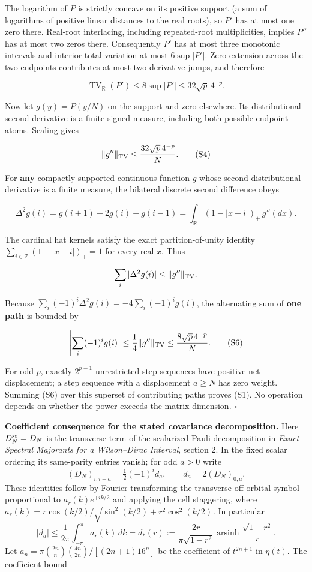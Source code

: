 \documentclass[
  10pt,
  a4paper,
]{article}
\begin{document}
The logarithm of \(P\) is strictly concave on its positive support (a sum of logarithms of positive linear distances to the real roots), so \(P'\) has at most one zero there. Real-root interlacing, including repeated-root multiplicities, implies \(P''\) has at most two zeros there. Consequently \(P'\) has at most three monotonic intervals and interior total variation at most \(6 \sup|P'|\). Zero extension across the two endpoints contributes at most two derivative jumps, and therefore

\[
\operatorname{TV}_{\mathbb R}(P')\le 8\sup|P'|
\le32\sqrt p\,4^{-p}.
\tag{S3}
\]

Now let \(g(y)=P(y/N)\) on the support and zero elsewhere. Its distributional second derivative is a finite signed measure, including both possible endpoint atoms. Scaling gives

\[
\|g''\|_{\rm TV}\le \frac{32\sqrt p\,4^{-p}}{N}.
\tag{S4}
\]

For \textbf{any} compactly supported continuous function \(g\) whose second distributional derivative is a finite measure, the bilateral discrete second difference obeys

\[
\Delta^2g(i)=g(i+1)-2g(i)+g(i-1)
 =\int_{\mathbb R}(1-|x-i|)_+\,g''(dx).
\tag{S5}
\]

The cardinal hat kernels satisfy the exact partition-of-unity identity \(\sum_{i\in\mathbb Z}(1-|x-i|)_+=1\) for every real \(x\). Thus

\[
\sum_i|\Delta^2g(i)|\le\|g''\|_{\rm TV}.
\]

Because \(\sum_i (-1)^i \Delta^2 g(i)=-4 \sum_i(-1)^i g(i)\), the alternating sum of \textbf{one path} is bounded by

\[
\left|\sum_i(-1)^i g(i)\right|
 \le\frac14\|g''\|_{\rm TV}
 \le\frac{8\sqrt p\,4^{-p}}{N}.
\tag{S6}
\]

For odd \(p\), exactly \(2^{p-1}\) unrestricted step sequences have positive net displacement; a step sequence with a displacement \(a\ge N\) has zero weight. Summing (S6) over this superset of contributing paths proves (S1). No operation depends on whether the power exceeds the matrix dimension. \(\square\)

\textbf{Coefficient consequence for the stated covariance decomposition.} Here \(D_N^{\rm st}=D_N\) is the transverse term of the scalarized Pauli decomposition in \emph{Exact Spectral Majorants for a Wilson--Dirac Interval}, section 2. In the fixed scalar ordering its same-parity entries vanish; for odd \(a>0\) write \[
(D_N)_{i,i+a}=\tfrac12(-1)^i d_a,\qquad d_a=2(D_N)_{0,a}.
\] These identities follow by Fourier transforming the transverse off-orbital symbol proportional to \(a_r(k)e^{\mp ik/2}\) and applying the cell staggering, where \(a_r(k)=r\cos(k/2)/\sqrt{\sin^2(k/2)+r^2\cos^2(k/2)}\). In particular \[
|d_a|\le\frac1{2\pi}\int_{-\pi}^{\pi}a_r(k)\,dk
=d_*(r):=\frac{2r}{\pi\sqrt{1-r^2}}
\operatorname{arsinh}\frac{\sqrt{1-r^2}}r.
\] Let \(a_n=\pi\binom{2n}{n}\binom{4n}{2n}/[(2n+1)16^n]\) be the coefficient of \(t^{2n+1}\) in \(\eta(t)\). The coefficient bound
\end{document}
